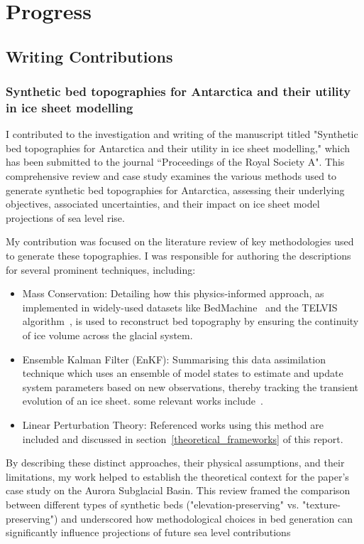 \chapter{Progress}\label{progress}
\section{Writing Contributions}

\subsection{Synthetic bed topographies for Antarctica and their utility in ice sheet modelling}
I contributed to the investigation and writing of the manuscript titled "Synthetic bed topographies for Antarctica and their utility in ice sheet modelling," which has been submitted to the journal ``Proceedings of the Royal Society A". This comprehensive review and case study examines the various methods used to generate synthetic bed topographies for Antarctica, assessing their underlying objectives, associated uncertainties, and their impact on ice sheet model projections of sea level rise.

My contribution was focused on the literature review of key methodologies used to generate these topographies. I was responsible for authoring the descriptions for several prominent techniques, including:
\begin{itemize}
\item{Mass Conservation}: Detailing how this physics-informed approach, as implemented in widely-used datasets like BedMachine~\cite{Morlighem_2020} and the TELVIS algorithm~\cite{TELVIS_2011}, is used to reconstruct bed topography by ensuring the continuity of ice volume across the glacial system.

\item{Ensemble Kalman Filter (EnKF)}: Summarising this data assimilation technique which uses an ensemble of model states to estimate and update system parameters based on new observations, thereby tracking the transient evolution of an ice sheet. some relevant works include~\cite{Gillet-Chaulet_2020, Choi_2025}.

\item{Linear Perturbation Theory}: Referenced works using this method are included and discussed in section~\ref{theoretical_frameworks} of this report.

\end{itemize}

By describing these distinct approaches, their physical assumptions, and their limitations, my work helped to establish the theoretical context for the paper's case study on the Aurora Subglacial Basin. This review framed the comparison between different types of synthetic beds ("elevation-preserving" vs. "texture-preserving") and underscored how methodological choices in bed generation can significantly influence projections of future sea level contributions

